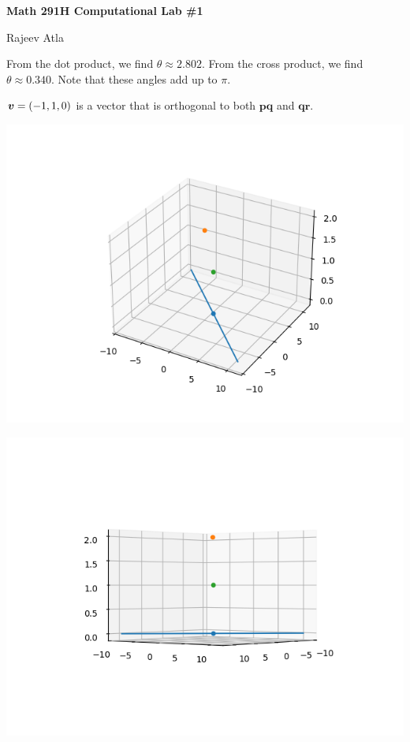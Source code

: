 \documentclass{article}
\begin{document}
\begin{center}
    \Large \textbf{Math 291H Computational Lab \#1}
\end{center}
  
\begin{center}
    \Large Rajeev Atla
\end{center}







From the dot product, we find $\theta \approx 2.802$.
From the cross product, we find $\theta \approx 0.340$.
Note that these angles add up to $\pi$.



$\bm{v} = \left ( -1, 1, 0 \right)$ is a vector that is orthogonal to both $\bm{pq}$ and $\bm{qr}$.



\includegraphics{fig1.png}

\includegraphics{fig2.png}
\end{document}
